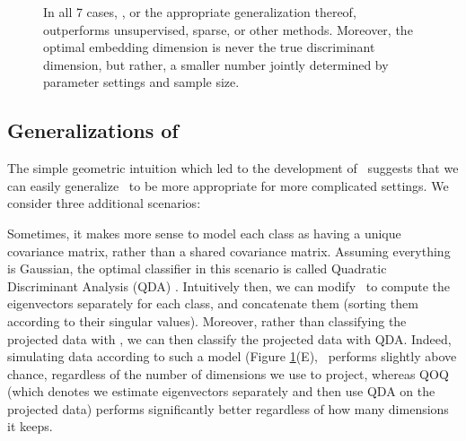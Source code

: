 \documentclass[10pt]{article}
\begin{document}
\begin{figure}[h!]
{%
In all 7 cases, \Lol, or the appropriate generalization thereof, outperforms unsupervised, sparse, or other methods.  Moreover, the optimal embedding dimension is never the true discriminant dimension, but rather, a smaller number jointly determined by parameter settings and sample size.
}
\label{fig:properties}
\end{figure}



\subsection*{Generalizations of \Lol}

The simple geometric intuition which led to the development of \Lol~suggests that we can easily generalize \Lol~to be more appropriate for more complicated settings. We consider three additional scenarios:

 Sometimes, it makes more sense to model each class as having a unique covariance matrix, rather than a shared covariance matrix.  Assuming everything is Gaussian, the optimal classifier in this scenario is called  Quadratic Discriminant Analysis (QDA) \cite{TBF01}.  Intuitively then, we can modify \Lol~to compute the eigenvectors separately for each class, and concatenate them (sorting them according to their singular values).  Moreover, rather than classifying the projected data with \Lda, we can then classify the projected data with QDA.  Indeed, simulating data according to such a model (Figure \ref{fig:properties}(E), \Lol~performs slightly above chance, regardless of the number of dimensions we use to project, whereas QOQ (which denotes we estimate eigenvectors separately and then use QDA on the projected data) performs significantly better regardless of how many dimensions it keeps.
\end{document}
